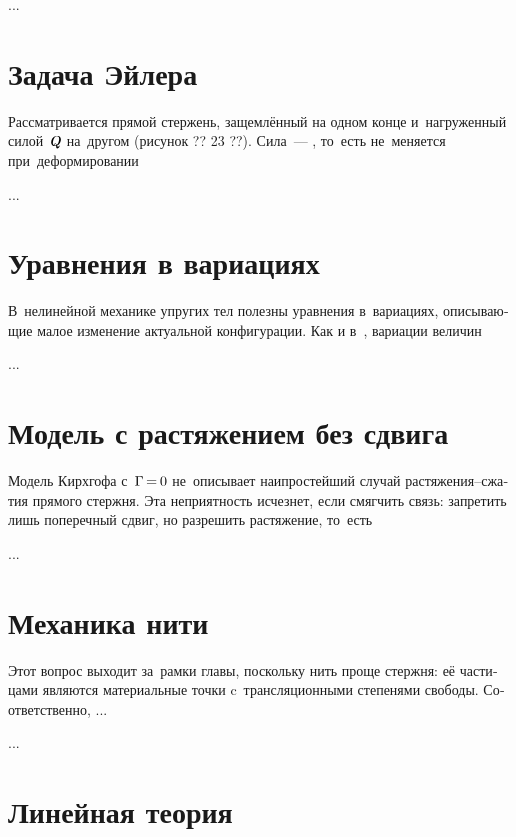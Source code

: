 \begin{otherlanguage}{russian}
...



\section{Задача Эйлера}

Рассматривается прямой стержень, защемлённый на одном конце и~нагруженный силой~$\mathboldQ$ на~другом (рисунок ?? 23 ??). Сила~--- , то~есть не~меняется при~деформировании

...



\section{Уравнения в вариациях}

В~нелинейной механике упругих тел полезны уравнения в~вариациях, описывающие малое изменение актуальной конфигурации. Как и в~, вариации величин

...



\section{Модель с растяжением без сдвига}

Модель Кирхгофа с~${\Gamma \hspace{-0.25ex}=\hspace{-0.2ex} 0}$ не~описывает наипростейший случай растяжения\hbox{--}сжатия прямого стержня. Эта неприятность исчезнет, если смягчить связь: запретить лишь поперечный сдвиг, но разрешить растяжение, то~есть

...



\section{Механика нити}

Этот вопрос выходит за~рамки главы, поскольку нить проще стержня: её частицами являются  материальные точки c~трансляционными степенями свободы. Соответственно, ...

...



\section{Линейная теория}


\end{otherlanguage}
